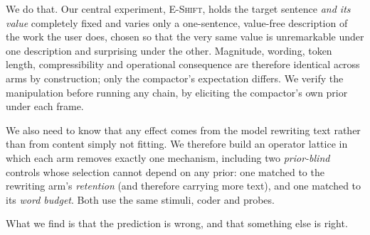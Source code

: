 We do that. Our central experiment, \textsc{E-Shift}, holds the target sentence \emph{and its value}
completely fixed and varies only a one-sentence, value-free description of the work the user does,
chosen so that the very same value is unremarkable under one description and surprising under the
other. Magnitude, wording, token length, compressibility and operational consequence are therefore
identical across arms by construction; only the compactor's expectation differs. We verify the
manipulation before running any chain, by eliciting the compactor's own prior under each frame.

We also need to know that any effect comes from the model rewriting text rather than from content
simply not fitting. We therefore build an operator lattice in which each arm removes exactly one
mechanism, including two \emph{prior-blind} controls whose selection cannot depend on any prior:
one matched to the rewriting arm's \emph{retention} (and therefore carrying more text), and one
matched to its \emph{word budget}. Both use the same stimuli, coder and probes.

What we find is that the prediction is wrong, and that something else is right.

